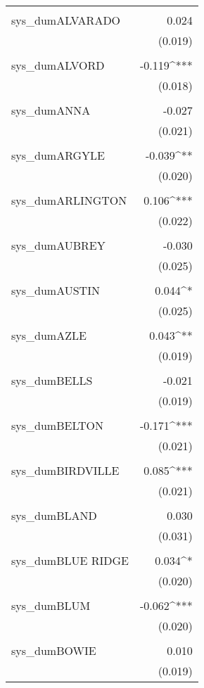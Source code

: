 \begin{table}[!htbp]
\begin{tabular}{@{\extracolsep{5pt}}lD{.}{.}{-3} }
  & \\ 
 sys\_dumALVARADO & 0.024 \\ 
  & (0.019) \\ 
  & \\ 
 sys\_dumALVORD & -0.119^{***} \\ 
  & (0.018) \\ 
  & \\ 
 sys\_dumANNA & -0.027 \\ 
  & (0.021) \\ 
  & \\ 
 sys\_dumARGYLE & -0.039^{**} \\ 
  & (0.020) \\ 
  & \\ 
 sys\_dumARLINGTON & 0.106^{***} \\ 
  & (0.022) \\ 
  & \\ 
 sys\_dumAUBREY & -0.030 \\ 
  & (0.025) \\ 
  & \\ 
 sys\_dumAUSTIN & 0.044^{*} \\ 
  & (0.025) \\ 
  & \\ 
 sys\_dumAZLE & 0.043^{**} \\ 
  & (0.019) \\ 
  & \\ 
 sys\_dumBELLS & -0.021 \\ 
  & (0.019) \\ 
  & \\ 
 sys\_dumBELTON & -0.171^{***} \\ 
  & (0.021) \\ 
  & \\ 
 sys\_dumBIRDVILLE & 0.085^{***} \\ 
  & (0.021) \\ 
  & \\ 
 sys\_dumBLAND & 0.030 \\ 
  & (0.031) \\ 
  & \\ 
 sys\_dumBLUE RIDGE & 0.034^{*} \\ 
  & (0.020) \\ 
  & \\ 
 sys\_dumBLUM & -0.062^{***} \\ 
  & (0.020) \\ 
  & \\ 
 sys\_dumBOWIE & 0.010 \\ 
  & (0.019) \\ 

\end{tabular}
\end{table}
